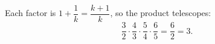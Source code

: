 Each factor is $1+\dfrac{1}{k}=\dfrac{k+1}{k}$, so the product telescopes:
\[
\dfrac{3}{2}\cdot\dfrac{4}{3}\cdot\dfrac{5}{4}\cdot\dfrac{6}{5}=\dfrac{6}{2}=\boxed{3}.
\]
